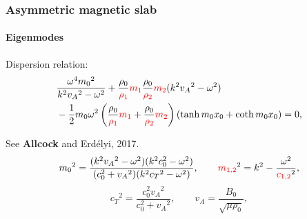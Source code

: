 \documentclass[table]{beamer}
\begin{document}
\begin{frame}
\frametitle{Asymmetric magnetic slab}
\framesubtitle{Eigenmodes}
\begin{block}{Dispersion relation:}
\vspace{-0.5cm}
\begin{align*}
&\frac{\omega^4{m_0}^2}{k^2{v_A}^2-\omega^2}+\frac{\rho_0}{\textcolor{red}{\rho_1}}\textcolor{red}{m_1}\frac{\rho_0}{\textcolor{red}{\rho_2}}\textcolor{red}{m_2}(k^2{v_A}^2-\omega^2) \\
&-\frac{1}{2}{m_0}\omega^2\left(\frac{\rho_0}{\textcolor{red}{\rho_1}}\textcolor{red}{m_1}+\frac{\rho_0}{\textcolor{red}{\rho_2}}\textcolor{red}{m_2}\right)\left(\tanh{{m_0}x_0}+\coth{{m_0}x_0}\right)=0,
\end{align*}
\end{block}
\scriptsize
See \textbf{Allcock} and Erd\'{e}lyi, 2017.
\begin{equation*}
{m_0}^2=\frac{(k^2{v_A}^2-\omega^2)(k^2c_0^2-\omega^2)}{(c_0^2+{v_A}^2)(k^2{c_T}^2-\omega^2)}, \qquad
\textcolor{red}{m_{1,2}}^2=k^2-\frac{\omega^2}{\textcolor{red}{c_{1,2}}^2},
\end{equation*}
\begin{equation*}
{c_T}^2=\frac{c_0^2{v_A}^2}{c_0^2+{v_A}^2}, \qquad {v_A}=\frac{{B_0}}{\sqrt{{\mu}\rho_0}},
\end{equation*}
\end{frame}
%
%
%
%
%
%
%
%
%
%
%
%
%
\end{document}
